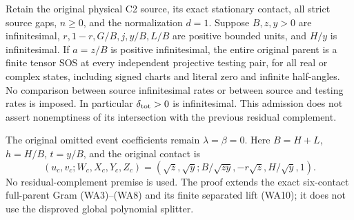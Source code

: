 \label{p296e824cb97a:sec:r10-weak-boundary}

\begin{theorem}
Retain the original physical C2 source, its exact stationary contact,
all strict source gaps, $n\ge0$, and the normalization $d=1$.
Suppose $B,z,y>0$ are infinitesimal,
$r,1-r,G/B,j,y/B,L/B$ are positive bounded units, and $H/y$ is
infinitesimal. If $a=z/B$ is positive infinitesimal, the entire
original parent is a finite tensor SOS at every independent
projective testing pair, for all real or complex states, including
signed charts and literal zero and infinite half-angles.
No comparison between source infinitesimal rates or between source
and testing rates is imposed. In particular $\delta_{\rm tot}>0$
is infinitesimal. This admission does not assert nonemptiness of
its intersection with the previous residual complement.
\end{theorem}

The original omitted event coefficients remain $\lambda=\beta=0$.
Here $B=H+L$, $h=H/B$, $t=y/B$, and the original contact is
\[
 (u_c,v_c;W_c,X_c,Y_c,Z_c)
 =\left(\sqrt z,\sqrt y;B/\sqrt{zy},-r\sqrt z,H/\sqrt y,1\right).
\]
No residual-complement premise is used. The proof extends the exact
six-contact full-parent Gram (WA3)--(WA8) and its finite separated
lift (WA10); it does not use the disproved global polynomial splitter.

